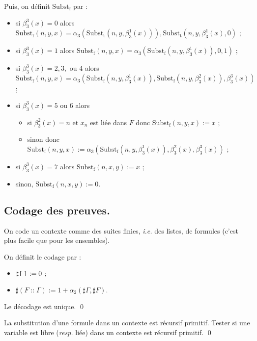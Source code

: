 \documentclass[./main]{subfiles}
\begin{document}
\begin{prv}
   Puis, on définit $\mathrm{Subst_f}$ par :
   \tiny
   \begin{itemize}
     \item si $\beta_3^3(x) = 0$ alors $\mathrm{Subst_f}(n, y, x) = \alpha_3(\mathrm{Subst_t}(n, y, \beta_3^1(x))), \mathrm{Subst_t}(n, y, \beta_3^1(x), 0)$ ;
     \item si $\beta_3^3(x) = 1$ alors $\mathrm{Subst_f}(n, y, x) = \alpha_3(\mathrm{Subst_f}(n, y, \beta_3^1(x)), 0, 1)$ ;
     \item si $\beta_3^3(x) = 2, 3, \text{ ou } 4$ alors $\mathrm{Subst_f}(n, y, x) = \alpha_3(\mathrm{Subst_f}(n, y, \beta_3^1(x)), \mathrm{Subst_f}(n, y, \beta_3^2(x)), \beta_3^3(x))$ ;
     \item si $\beta_3^3(x) = 5 \text{ ou } 6$ alors
       \begin{itemize}
         \item si $\beta_3^2(x) = n$ et $x_n$ est liée dans $F$ donc $\mathrm{Subst_f}(n, y, x) := x$ ;
         \item sinon donc $\mathrm{Subst_f}(n, y, x) := \alpha_3(\mathrm{Subst_f}(n, y, \beta_3^1(x)), \beta_3^2(x), \beta_3^3(x))$ ;
       \end{itemize}
     \item si $\beta_3^3(x) = 7$ alors  $\mathrm{Subst_f}(n, x, y) := x$ ;
     \item sinon, $\mathrm{Subst_f}(n, x, y) := 0$.
   \end{itemize}
 \end{prv}

 \subsection{Codage des preuves.}

 On code un contexte comme des suites finies, \textit{i.e.} des listes, de formules (c'est plus facile que pour les ensembles).
 \begin{defn}
   On définit le codage par :
   \begin{itemize}
     \item $\sharp \texttt{[\:]} := 0$ ;
     \item $\sharp (F \mathop{\texttt{::}} \Gamma) := 1 + \alpha_2(\sharp \Gamma, \sharp F)$.
   \end{itemize}
 \end{defn}

 \begin{lem} Le décodage est unique. \qed \end{lem}
 \begin{lem}
   La substitution d'une formule dans un contexte est récursif primitif.
   Tester si une variable est libre (\textit{resp.} liée) dans un contexte est récursif primitif.
   \qed
 \end{lem}
\end{document}

